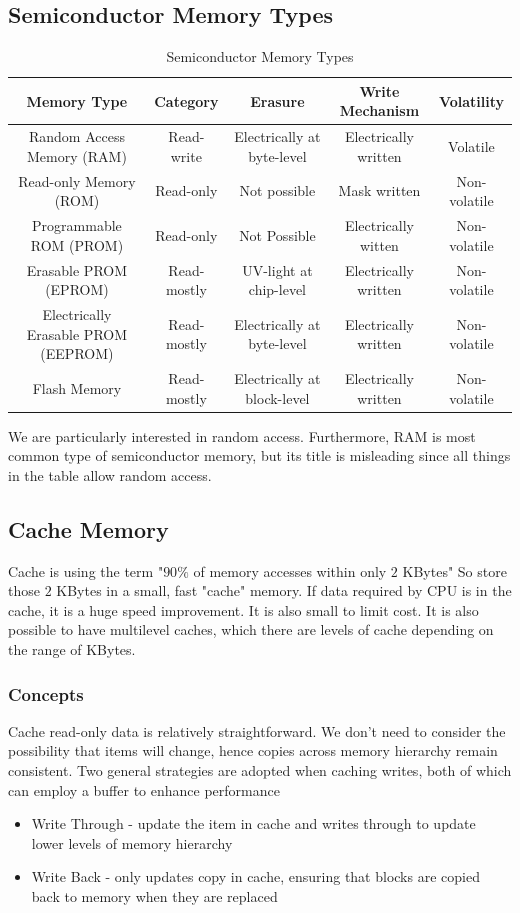 \documentclass[a4paper]{article}
\theoremstyle{plain}
\theoremstyle{definition}
\theoremstyle{remark}
\begin{document}
\subsection{Semiconductor Memory Types}
\begin{table}[H]
	\centering
	\caption{Semiconductor Memory Types}
	\label{tab:semiconductor}
	\begin{tabular}{c|c|c|c|c}
	Memory Type & Category & Erasure & Write Mechanism & Volatility \\
	\hline
	Random Access Memory (RAM) & Read-write & Electrically at byte-level & Electrically written & Volatile \\
	Read-only Memory (ROM) & Read-only & Not possible & Mask written & Non-volatile \\
	Programmable ROM (PROM) & Read-only & Not Possible & Electrically witten & Non-volatile \\
	Erasable PROM (EPROM) & Read-mostly & UV-light at chip-level & Electrically written & Non-volatile \\
	Electrically Erasable PROM (EEPROM) & Read-mostly & Electrically at byte-level & Electrically written & Non-volatile \\
	Flash Memory & Read-mostly & Electrically at block-level & Electrically written & Non-volatile \\
	\hline
	\end{tabular}
\end{table}
We are particularly interested in random access. Furthermore, RAM is most common type of semiconductor memory, but its title is misleading since all things in the table allow random access.
\subsection{Cache Memory}
Cache is using the term "$90\%$ of memory accesses within only $2$ KBytes"
So store those $2$ KBytes in a small, fast "cache" memory. If data required by CPU is in the cache, it is a huge speed improvement. It is also small to limit cost. It is also possible to have multilevel caches, which there are levels of cache depending on the range of KBytes.
\subsubsection{Concepts}
Cache read-only data is relatively straightforward. We don't need to consider the possibility that items will change, hence copies across memory hierarchy remain consistent. Two general strategies are adopted when caching writes, both of which can employ a buffer to enhance performance
\begin{itemize}
	\item Write Through - update the item in cache and writes through to update lower levels of memory hierarchy
	\item Write Back - only updates copy in cache, ensuring that blocks are copied back to memory when they are replaced
\end{itemize}
\end{document}
